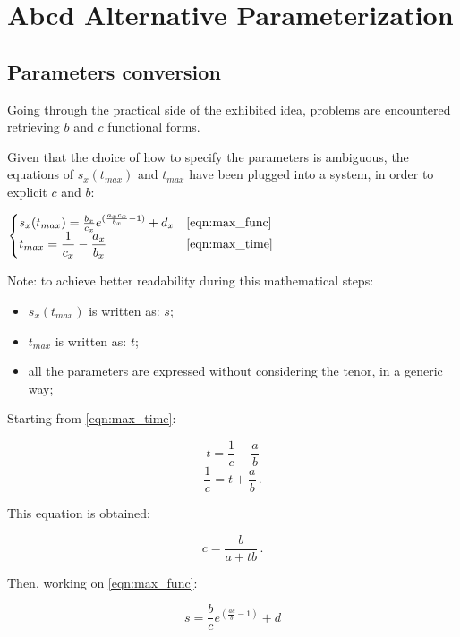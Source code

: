 \chapter{Abcd Alternative Parameterization}
\label{chap:Abcd Reparameterization}


\section{Parameters conversion}
Going through the practical side of the exhibited idea, problems are encountered retrieving $b$ and $c$ functional forms.

Given that the choice of how to specify the parameters is ambiguous, the equations of $s_{x}(t_{max})$ and $t_{max}$ have been plugged into a system, in order to explicit $c$ and $b$:


$\begin{cases} 
s_{x}(t_{max})=\frac{b_{x}}{c_{x}} e^{(\frac{a_{x}c_{x}}{b_{x}}-1)} +d_{x} &\eqref{eqn:max_func}
\\
t_{max}=\dfrac{1}{c_{x}} - \dfrac{a_{x}} {b_{x}} & \eqref{eqn:max_time}
\end{cases}$


Note: to achieve better readability during this mathematical steps:
\begin{itemize}
\item $s_{x}(t_{max})$ is written as: $s$;
\item $t_{max}$ is written as: $t$; 
\item all the parameters are expressed without considering the tenor, in a generic way;
\end{itemize}
Starting from \eqref{eqn:max_time}:

\begin{equation*}
t=\dfrac{1}{c} - \dfrac{a} {b}
\end{equation*}
\begin{equation*}
\dfrac{1}{c}= t+\dfrac{a} {b}\,.
\end{equation*}

This equation is obtained:

\begin{equation}
 c=\dfrac{b} {a+tb} \,.
\label{eqn:c_max}
\end{equation}

Then, working on \eqref{eqn:max_func}:

\begin{equation*}
s=\frac{b}{c} e^{\left(\frac{ac}{b}-1\right)} +d 
\end{equation*}

